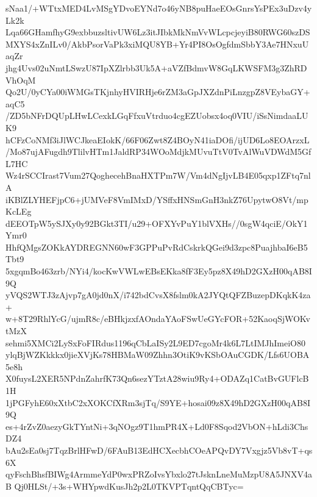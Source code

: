 sNaa1/+WTtxMED4LvMSgYDvoEYNd7o46yNB8puHaeEOsGnrsYsPEx3uDzv4yLk2k
Lqa66GHamfhyG9exbbuzsltivUW6Lz3itJIbkMkNmVvWLcpcjeyiB80RWG60szDS
MXYS4xZnILv0/AkbPsorVaPk3xiMQU8YB+Yr4PI8OsOgfdmSbbY3Ae7HNxuUaqZr
jhg4Uvs02uNmtLSwzU87IpXZlrbb3Uk5A+aVZfBdmvW8GqLKWSFM3g3ZhRDVhOqM
Qo2U/0yCYa00iWMGsTKjnhyHVIRHje6rZM3aGpJXZdnPiLnzgpZ8VEybaGY+aqC5
/ZD5bNFrDQUpLHwLCexkLGqFfxuVtrduo4cgEZUobsx4oq0VIU/iSsNimdaaLUK9
hCFzCoNMf3iJlWCJkeaEIokK/66F06Zwt8Z4BOyN41iaDOfi/ijUD6Lo8EOArzxL
/Mo87ujAFugdh9TlilvHTm1JaldRP34WOoMdjkMUvuTtV0TvAlWuVDWdM5GfL7HC
Wz4rSCCIrast7Vum27QoghecehBnaHXTPm7W/Vm4dNgIjvLB4E05qxp1ZFtq7nlA
iKBlZLYHEFjpC6+jUMVeF8VmIMxD/YSffxHNSmGnH3nkZ76UpytwO8Vt/mpKcLEg
dEEOTpW5ySJXy0y92BGkt3TI/u29+OFXYvPuY1blVXHs//0sgW4qciE/OkY1Ymr0
HhfQMgsZOKkAYDREGNN60wF3GPPuPvRdCskrkQGei9d3zpc8PuajhbaI6eB5Tbt9
5xgqmBo463zrb/NYi4/kocKwVWLwEBsEKka8fF3Ey5pz8X49hD2GXzH00qAB8I9Q
yVQS2WTJ3zAjvp7gA0jd0nX/i742bdCvsX8fslm0kA2JYQtQFZBuzepDKqkK4za+
w+8T29RhlYcG/ujmR8c/eBHkjzxfAOndaYAoFSwUeGYcFOR+52KaoqSjWOKvtMzX
sehmi5XMCi2LySxFoFIRdus1196qCbLaISy2L9ED7cgoMr4k6L7LtIMJhImeiO80
ylqBjWZKkkkx0jieXVjKs78HBMaW09Zhhn3OtiK9vKSbOAuCGDK/Lfs6UOBA5e8h
X0fuysL2XER5NPdnZahrfK73Qn6sezYTztA28wiu9Ry4+ODAZq1CatBvGUFlcB1H
1jPGFyhE60xXtbC2xXOKCfXRm3sjTq/S9YE+hosai09z8X49hD2GXzH00qAB8I9Q
es+4rZvZ0aezyGkTYntNi+3qNOgz9T1hmPR4X+Ld0F8Sqod2VbON+hLdi3ChsDZ4
bAu2sEa0sj7TqzBrlHFwD/6FAuB13EdHCXecbhCOeAPQvDY7Vxgjz5Vb8vT+qs6X
qyFschBhsfBIWg4ArmmeYdP0wxPRZoIvsYbxlo27tJsknLneMuMzpU8A5JNXV4aB
Qj0HLSt/+3s+WHYpwdKusJh2p2L0TKVPTqntQqCBTyc=
